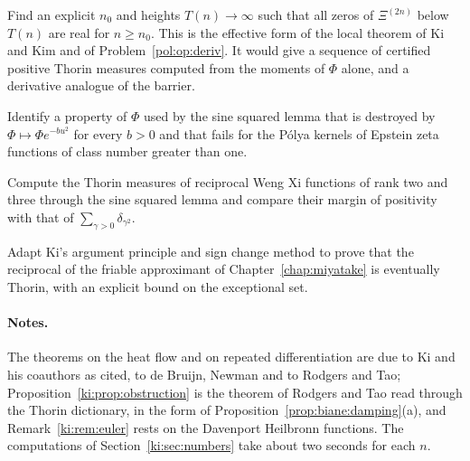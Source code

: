 \begin{problem}\label{ki:prob:ladder}
Find an explicit $n_0$ and heights $T(n)\to\infty$ such that all zeros of $\Xi^{(2n)}$ below $T(n)$ are real for $n\ge n_0$. This is the effective form of the local theorem of Ki and Kim \cite{KiKim00} and of Problem~\ref{pol:op:deriv}. It would give a sequence of certified positive Thorin measures computed from the moments of $\Phi$ alone, and a derivative analogue of the barrier.
\end{problem}

\begin{problem}\label{ki:prob:property}
Identify a property of $\Phi$ used by the sine squared lemma that is destroyed by $\Phi\mapsto\Phi e^{-bu^2}$ for every $b>0$ and that fails for the P\'olya kernels of Epstein zeta functions of class number greater than one.
\end{problem}

\begin{problem}\label{ki:prob:weng}
Compute the Thorin measures of reciprocal Weng Xi functions of rank two and three through the sine squared lemma and compare their margin of positivity with that of $\sum_{\gamma>0}\delta_{\gamma^2}$.
\end{problem}

\begin{problem}\label{ki:prob:friable}
Adapt Ki's argument principle and sign change method to prove that the reciprocal of the friable approximant of Chapter~\ref{chap:miyatake} is eventually Thorin, with an explicit bound on the exceptional set.
\end{problem}

\paragraph{Notes.} The theorems on the heat flow and on repeated differentiation are due to Ki and his coauthors as cited, to de Bruijn, Newman and to Rodgers and Tao; Proposition~\ref{ki:prop:obstruction} is the theorem of Rodgers and Tao read through the Thorin dictionary, in the form of Proposition~\ref{prop:biane:damping}(a), and Remark~\ref{ki:rem:euler} rests on the Davenport Heilbronn functions. The computations of Section~\ref{ki:sec:numbers} take about two seconds for each $n$.
